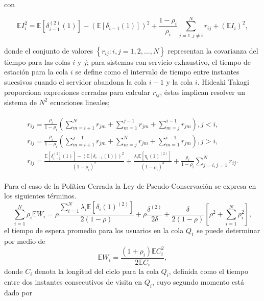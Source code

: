 \documentclass{article}
\newcommand{\esp}{\mathbb{E}}
\numberwithin{equation}{section}
\begin{document}
con

\begin{equation}\label{SdoMomento.Periodo.Intervisita}
\esp
I_{i}^{2}=\esp\left[\delta_{i-1}^{(2)}\left(1\right)\right]-\left(\esp\left[\delta_{i-1}\left(1\right)\right]\right)^{2}+
\frac{1-\rho_{i}}{\rho_{i}}\sum_{j=1,j\neq i}^{N}r_{ij}+\left(\esp
I_{i}\right)^{2},
\end{equation}

donde el conjunto de valores $\left\{r_{ij}:i,j=1,2,\ldots,N\right\}$ representan la covarianza del tiempo para las colas $i$ y $j$; para sistemas con servicio exhaustivo, el tiempo de estaci\'on para la cola $i$ se define como el intervalo de tiempo entre instantes sucesivos cuando el servidor abandona la cola $i-1$ y la cola $i$. Hideaki Takagi \cite{Takagi} proporciona expresiones cerradas para calcular $r_{ij}$, \'estas implican resolver un sistema de $N^{2}$ ecuaciones lineales;

\begin{eqnarray}\label{Eq.Cov.TT}
\begin{array}{l}
r_{ij}=\frac{\rho_{i}}{1-\rho_{i}}\left(\sum_{m=i+1}^{N}r_{jm}+\sum_{m=1}^{j-1}r_{jm}+\sum_{m=j}^{i-1}r_{jm}\right),\textrm{
}j<i,\\
r_{ij}=\frac{\rho_{i}}{1-\rho_{i}}\left(\sum_{m=i+1}^{j-1}r_{jm}+\sum_{m=j}^{N}r_{jm}+\sum_{m=1}^{i-1}r_{jm}\right),\textrm{
}j>i,\\
r_{ij}=\frac{\esp\left[\delta_{i-1}^{(2)}\left(1\right)\right]-\left(\esp\left[\delta_{i-1}\left(1\right)\right]\right)^{2}}
{\left(1-\rho_{i}\right)^{2}}+\frac{\lambda_{i}\esp\left[\eta_{i}\left(1\right)^{(2)}\right]}{\left(1-\rho_{i}\right)^{3}}+\frac{\rho_{i}}{1-\rho_{i}}\sum_{j=i,j=1}^{N}r_{ij}.
\end{array}
\end{eqnarray}

Para el caso de la Pol\'itica Cerrada la Ley de Pseudo-Conservaci\'on se expresa en los siguientes t\'erminos.
\begin{equation}\label{LPCPG}
\sum_{i=1}^{N}\rho_{i}\esp
W_{i}=\rho\frac{\sum_{i=1}^{N}\lambda_{i}\esp\left[\delta_{i}\left(1\right)^{(2)}\right]}{2\left(1-\rho\right)}+\rho\frac{\delta^{(2)}}{2\delta}+\frac{\delta}{2\left(1-\rho\right)}\left[\rho^{2}+\sum_{i=1}^{N}\rho_{i}^{2}\right],
\end{equation}
el tiempo de espera promedio para los usuarios en la cola $Q_{1}$ se puede determinar por medio de
\begin{equation}\label{Eq.Tiempo.Espera.Gated}
\esp W_{i}=\frac{\left(1+\rho_{i}\right)\esp C_{i}^{2}}{2\esp
C_{i}},
\end{equation}
donde $C_{i}$ denota la longitud del ciclo para la cola $Q_{i}$, definida como el tiempo entre dos instantes consecutivos de visita en $Q_{i}$, cuyo segundo momento est\'a dado por
\end{document}

